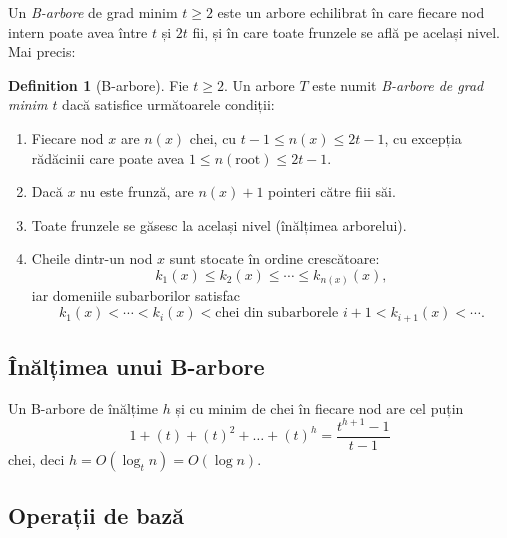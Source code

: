 \documentclass[11pt,a4paper]{article}
\theoremstyle{definition}
\newtheorem{definition}{Definition}[section]
\theoremstyle{plain}
\theoremstyle{remark}
\begin{document}
Un \emph{B-arbore} de grad minim \(t\ge2\) este un arbore echilibrat în care fiecare nod intern poate avea între \(t\) și \(2t\) fii, și în care toate frunzele se află pe același nivel. Mai precis:

\begin{definition}[B-arbore]
  Fie \(t\ge2\). Un arbore \(T\) este numit \emph{B-arbore de grad minim \(t\)} dacă satisfice următoarele condiții:
  \begin{enumerate}
    \item Fiecare nod \(x\) are \(n(x)\) chei, cu \(t-1\le n(x)\le 2t-1\), cu excepția rădăcinii care poate avea \(1\le n(\mathrm{root})\le 2t-1\).
    \item Dacă \(x\) nu este frunză, are \(n(x)+1\) pointeri către fiii săi.
    \item Toate frunzele se găsesc la același nivel (înălțimea arborelui).
    \item Cheile dintr-un nod \(x\) sunt stocate în ordine crescătoare:
      \[
        k_1(x)\le k_2(x)\le\cdots\le k_{n(x)}(x),
      \]
      iar domeniile subarborilor satisfac
      \[
        k_1(x)<\dotsb<k_{i}(x)< \text{chei din subarborele }i+1<k_{i+1}(x)<\dotsb.
      \]
  \end{enumerate}
\end{definition}

\subsection*{Înălțimea unui B-arbore}
Un B-arbore de înălțime \(h\) și cu minim de chei în fiecare nod are cel puțin
\[
  1 + (t) + (t)^2 + \dots + (t)^{h} = \frac{t^{h+1}-1}{t-1}
\]
chei, deci \(h = O(\log_t n) = O(\log n)\).

\subsection*{Operații de bază}
\end{document}
